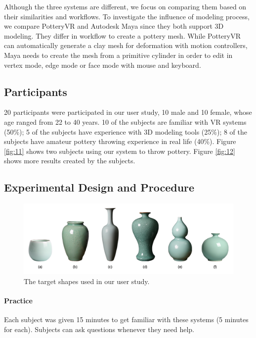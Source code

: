 \documentclass{svjour3}                     %
\begin{document}
Although the three systems are different, we focus on comparing them based on their similarities and workflows.
To investigate the influence of modeling process, we compare PotteryVR and Autodesk Maya since they both support 3D modeling. They differ in workflow to create a pottery mesh. While PotteryVR can automatically generate a clay mesh for deformation with motion controllers, Maya needs to create the mesh from a primitive cylinder in order to edit in vertex mode, edge mode or face mode with mouse and keyboard. 

\subsection{Participants}
\label{sec:6.2}
20 participants were participated in our user study, 10 male and 10 female, whose age ranged from 22 to 40 years. 10 of the subjects are familiar with VR systems (50\%); 5 of the subjects have experience with 3D modeling tools (25\%); 8 of the subjects have amateur pottery throwing experience in real life (40\%).
Figure \ref{fig:11} shows two subjects using our system to throw pottery. Figure \ref{fig:12} shows more results created by the subjects.

\subsection{Experimental Design and Procedure}
\label{sec:6.3}

\begin{figure}
\includegraphics[width=\textwidth]{target.pdf}
\caption{The target shapes used in our user study.}
\label{fig:target}
\end{figure}

\paragraph{Practice} Each subject was given 15 minutes to get familiar with these systems (5 minutes for each). Subjects can ask questions whenever they need help.
\end{document}

